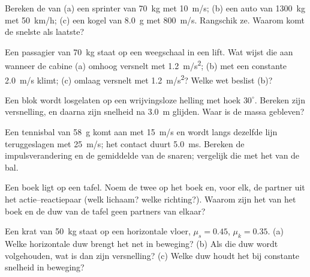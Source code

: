 \begin{exercise}[$\star$]\label{exo:g12:newtons-laws:1}
Bereken de  van (a) een sprinter van \qty{70}{kg} met \qty{10}{m/s}; (b) een
auto van \qty{1300}{kg} met \qty{50}{km/h}; (c) een kogel van \qty{8.0}{g} met
\qty{800}{m/s}. Rangschik ze. Waarom komt de snelste als laatste?
\end{exercise}

\begin{exercise}[$\star$]\label{exo:g12:newtons-laws:2}
Een passagier van \qty{70}{kg} staat op een weegschaal in een lift. Wat wijst die aan
wanneer de cabine (a) omhoog versnelt met \qty{1.2}{m/s^2}; (b) met een constante
\qty{2.0}{m/s} klimt; (c) omlaag versnelt met \qty{1.2}{m/s^2}? Welke wet beslist
(b)?
\end{exercise}

\begin{exercise}[$\star$]\label{exo:g12:newtons-laws:3}
Een blok wordt losgelaten op een wrijvingsloze helling met hoek $30^\circ$. Bereken
zijn versnelling, en daarna zijn snelheid na \qty{3.0}{m} glijden. Waar is de massa
gebleven?
\end{exercise}

\begin{exercise}[$\star$]\label{exo:g12:newtons-laws:4}
Een tennisbal van \qty{58}{g} komt aan met \qty{15}{m/s} en wordt langs dezelfde lijn
teruggeslagen met \qty{25}{m/s}; het contact duurt \qty{5.0}{ms}. Bereken de
impulsverandering en de gemiddelde  van de snaren; vergelijk die  met het
 van de bal.
\end{exercise}

\begin{exercise}[$\star$]\label{exo:g12:newtons-laws:5}
Een boek ligt op een tafel. Noem de twee  op het boek en, voor elk, de
partner uit het actie--reactiepaar (welk lichaam? welke richting?). Waarom zijn het
 van het boek en de duw van de tafel geen partners van elkaar?
\end{exercise}

\begin{exercise}[$\star\star$]\label{exo:g12:newtons-laws:6}
Een krat van \qty{50}{kg} staat op een horizontale vloer, $\mu_s = 0.45$,
$\mu_k = 0.35$. (a) Welke horizontale duw brengt het net in beweging? (b) Als die duw
wordt volgehouden, wat is dan zijn versnelling? (c) Welke duw houdt het bij constante
snelheid in beweging?
\end{exercise}

